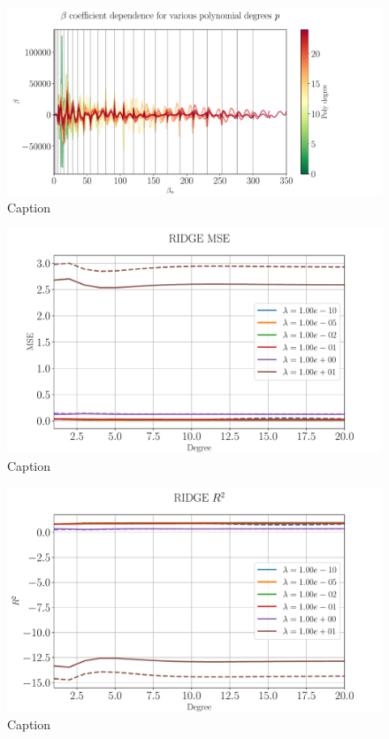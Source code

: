 \documentclass[%
reprint,
amsmath,amssymb,
aps,
pra,
]{revtex4-2}
\begin{document}
\begin{figure}[ht!]
\centering
\includegraphics[width=\linewidth]{Python/Figures/OLS/OLS_betano_scaling.pdf}
\caption{Caption}
\label{fig:OLS_beta_degree}
\end{figure}
\begin{figure}[ht!]
	\centering
	\includegraphics[width=\linewidth]{Python/Figures/Ridge/RIDGE_MSE_no_scaling.pdf}
	\caption{Caption}
	\label{fig:ridge_mse_degree}
\end{figure}
\begin{figure}[ht!]
	\centering
	\includegraphics[width=\linewidth]{Python/Figures/Ridge/RIDGE_R2_no_scaling.pdf}
	\caption{Caption}
	\label{fig:ridge_r2_degree}
\end{figure}
\end{document}
